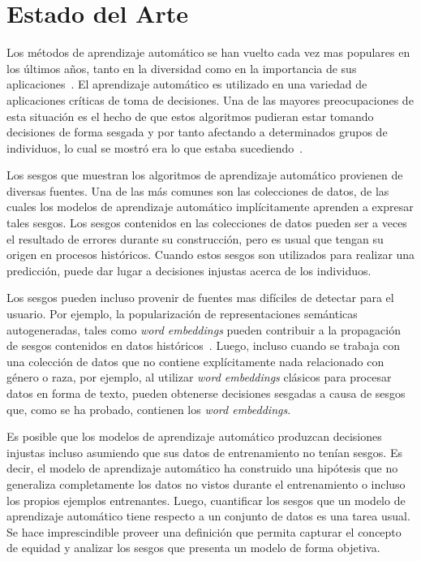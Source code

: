 \chapter{Estado del Arte}\label{chapter:state-of-the-art}

Los métodos de aprendizaje automático se han vuelto cada vez mas populares en los últimos años, tanto en la diversidad como en la importancia de sus aplicaciones~\parencite{chouldechova2018frontiers}.
El aprendizaje automático es utilizado en una variedad de aplicaciones críticas de toma de decisiones.
Una de las mayores preocupaciones de esta situación es el hecho de que estos algoritmos pudieran estar tomando decisiones de forma sesgada y por tanto afectando a determinados grupos de individuos, lo cual se mostró era lo que estaba sucediendo~\parencite{prorepublica2016bias}.

Los sesgos que muestran los algoritmos de aprendizaje automático provienen de diversas fuentes.
Una de las más comunes son las colecciones de datos, de las cuales los modelos de aprendizaje automático implícitamente aprenden a expresar tales sesgos.
Los sesgos contenidos en las colecciones de datos pueden ser a veces el resultado de errores durante su construcción, pero es usual que tengan su origen en procesos históricos.
Cuando estos sesgos son utilizados para realizar una predicción, puede dar lugar a decisiones injustas acerca de los individuos.

Los sesgos pueden incluso provenir de fuentes mas difíciles de detectar para el usuario.
Por ejemplo, la popularización de representaciones semánticas autogeneradas, tales como \emph{word embeddings} pueden contribuir a la propagación de sesgos contenidos en datos históricos~\parencite{bolukbasi2016man}.
Luego, incluso cuando se trabaja con una colección de datos que no contiene explícitamente nada relacionado con género o raza, por ejemplo, al utilizar \emph{word embeddings} clásicos para procesar datos en forma de texto, pueden obtenerse decisiones sesgadas a causa de sesgos que, como se ha probado, contienen los \emph{word embeddings}.

Es posible que los modelos de aprendizaje automático produzcan decisiones injustas incluso asumiendo que sus datos de entrenamiento no tenían sesgos.
Es decir, el modelo de aprendizaje automático ha construido una hipótesis que no generaliza completamente los datos no vistos durante el entrenamiento o incluso los propios ejemplos entrenantes.
Luego, cuantificar los sesgos que un modelo de aprendizaje automático tiene respecto a un conjunto de datos es una tarea usual.
Se hace imprescindible proveer una definición que permita capturar el concepto de equidad y analizar los sesgos que presenta un modelo de forma objetiva.


